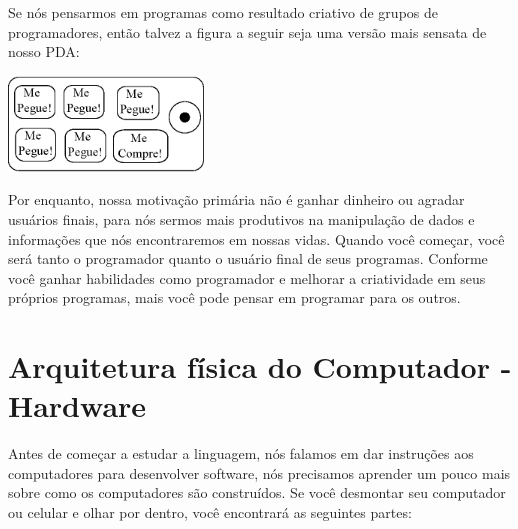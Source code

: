 Se nós pensarmos em programas como resultado criativo de grupos de programadores,
então talvez a figura a seguir seja uma versão mais sensata de nosso PDA:

\beforefig
\centerline{\includegraphics[height=1.00in]{figs2/pda2.eps}}
\afterfig

Por enquanto, nossa motivação primária não é ganhar dinheiro ou agradar usuários finais,
para nós sermos mais produtivos na manipulação de dados e informações
que nós encontraremos em nossas vidas.
Quando você começar, você será tanto o programador quanto o usuário final de seus
programas. Conforme você ganhar habilidades como programador e melhorar a criatividade
em seus próprios programas, mais você pode pensar em programar para os outros.
%

\section{Arquitetura física do Computador - Hardware}
%

Antes de começar a estudar a linguagem, nós falamos
em dar instruções aos computadores para desenvolver software,
nós precisamos aprender um pouco mais sobre como os computadores
são construídos. Se você desmontar seu computador ou celular e olhar
por dentro, você encontrará as seguintes partes:
%

